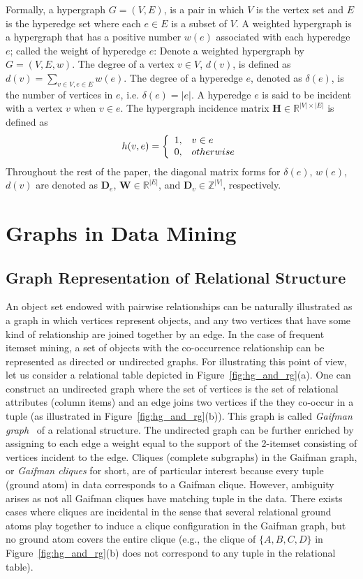 Formally, a hypergraph $G = (V,E)$, is a pair in which $V$ is the vertex set and $E$ is the hyperedge set where each $e \in E$ is a subset of $V$. A weighted hypergraph is a hypergraph that has a positive number $w(e)$ associated with each hyperedge $e$; called the weight of hyperedge $e$: Denote a weighted hypergraph by $G = (V,E,w)$. The degree of a vertex $v \in V$, $d(v)$, is defined as $d(v) = \sum_{v\in V, e\in E}{w(e)}$. The degree of a hyperedge $e$, denoted as $\delta(e)$, is the number of vertices in $e$, i.e. $\delta(e)=|e|$. A hyperedge $e$ is said to be incident with a vertex $v$ when $v \in e$. The hypergraph incidence matrix $\mathbf{H} \in \mathbb{R}^{|V| \times |E|}$ is defined as
\begin{equation}
\notag h(v,e)=\left\{\begin{array}{cl}
	   1, & v \in e \\
	   0, & otherwise
	   \end{array}\right.
\end{equation}
Throughout the rest of the paper, the diagonal matrix forms for $\delta(e)$, $w(e)$, $d(v)$ are denoted as $\mathbf{D}_e$, $\mathbf{W} \in \mathbb{R}^{|E|}$, and $\mathbf{D}_v \in \mathbb{Z}^{|V|}$, respectively.

\section{Graphs in Data Mining}
\subsection{Graph Representation of Relational Structure}
An object set endowed with pairwise relationships can be naturally illustrated as a graph in which vertices represent objects, and any two vertices that have some kind of relationship are joined together by an edge. In the case of frequent itemset mining, a set of objects with the co-occurrence relationship can be represented as directed or undirected graphs. For illustrating this point of view, let us consider a relational table depicted in Figure~\ref{fig:hg_and_rg}(a). One can construct an undirected graph where the set of vertices is the set of relational attributes (column items) and an edge joins two vertices if the they co-occur in a tuple (as illustrated in Figure~\ref{fig:hg_and_rg}(b)). This graph is called \emph{Gaifman graph}~\cite{Hodkinson02finiteconformal} of a relational structure. The undirected graph can be further enriched by assigning to each edge a weight equal to the support of the 2-itemset consisting of vertices incident to the edge. Cliques (complete subgraphs) in the Gaifman graph, or \emph{Gaifman cliques} for short, are of particular interest because every tuple (ground atom) in data corresponds to a Gaifman clique. However, ambiguity arises as not all Gaifman cliques have matching tuple in the data. There exists cases where cliques are incidental in the sense that several relational ground atoms play together to induce a clique configuration in the Gaifman graph, but no ground atom covers the entire clique (e.g., the clique of $\{A,B,C,D\}$ in Figure~\ref{fig:hg_and_rg}(b) does not correspond to any tuple in the relational table).

